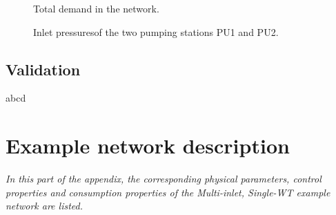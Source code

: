  \begin{figure}[H]
 \centering
  
 \vspace{-1.5mm}
 \caption{Total demand in the network.}
 \label{fig:sigma_example}
 \end{figure}

 \begin{figure}[H]
 \centering
  
 \vspace{-1.5mm}
 \caption{Inlet pressuresof the two pumping stations PU1 and PU2.}
 \label{fig:sigma_example}
 \end{figure}

\section{Validation}
\label{validation_tests} 

abcd

\chapter{Example network description}
\label{physical_properties_example1}

\emph{In this part of the appendix, the corresponding physical parameters, control properties and consumption properties of the Multi-inlet, Single-WT example network are listed.}




